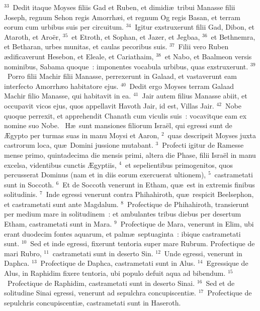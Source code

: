 ${}^{33}$~Dedit itaque Moyses filiis Gad et Ruben, et dimidi\ae\ tribui Manasse filii Joseph, regnum Sehon regis Amorrh\ae i, et regnum Og regis Basan, et terram eorum cum urbibus suis per circuitum.
${}^{34}$~Igitur exstruxerunt filii Gad, Dibon, et Ataroth, et Aro\"er,
${}^{35}$~et Etroth, et Sophan, et Jazer, et Jegbaa,
${}^{36}$~et Bethnemra, et Betharan, urbes munitas, et caulas pecoribus suis.
${}^{37}$~Filii vero Ruben \ae dificaverunt Hesebon, et Eleale, et Cariathaim,
${}^{38}$~et Nabo, et Baalmeon versis nominibus, Sabama quoque~: imponentes vocabula urbibus, quas exstruxerunt.
${}^{39}$~Porro filii Machir filii Manasse, perrexerunt in Galaad, et vastaverunt eam interfecto Amorrh\ae o habitatore ejus.
${}^{40}$~Dedit ergo Moyses terram Galaad Machir filio Manasse, qui habitavit in ea.
${}^{41}$~Jair autem filius Manasse abiit, et occupavit vicos ejus, quos appellavit Havoth Jair, id est, Villas Jair.
${}^{42}$~Nobe quoque perrexit, et apprehendit Chanath cum viculis suis~: vocavitque eam ex nomine suo Nobe.
~H\ae\ sunt mansiones filiorum Isra\"el, qui egressi sunt de \AE gypto per turmas suas in manu Moysi et Aaron,
${}^{2}$~quas descripsit Moyses juxta castrorum loca, qu\ae\ Domini jussione mutabant.
${}^{3}$~Profecti igitur de Ramesse mense primo, quintadecima die mensis primi, altera die Phase, filii Isra\"el in manu excelsa, videntibus cunctis \AE gyptiis,
${}^{4}$~et sepelientibus primogenitos, quos percusserat Dominus (nam et in diis eorum exercuerat ultionem),
${}^{5}$~castrametati sunt in Soccoth.
${}^{6}$~Et de Soccoth venerunt in Etham, qu\ae\ est in extremis finibus solitudinis.
${}^{7}$~Inde egressi venerunt contra Phihahiroth, qu\ae\ respicit Beelsephon, et castrametati sunt ante Magdalum.
${}^{8}$~Profectique de Phihahiroth, transierunt per medium mare in solitudinem~: et ambulantes tribus diebus per desertum Etham, castrametati sunt in Mara.
${}^{9}$~Profectique de Mara, venerunt in Elim, ubi erant duodecim fontes aquarum, et palm\ae\ septuaginta~: ibique castrametati sunt.
${}^{10}$~Sed et inde egressi, fixerunt tentoria super mare Rubrum. Profectique de mari Rubro,
${}^{11}$~castrametati sunt in deserto Sin.
${}^{12}$~Unde egressi, venerunt in Daphca.
${}^{13}$~Profectique de Daphca, castrametati sunt in Alus.
${}^{14}$~Egressique de Alus, in Raphidim fixere tentoria, ubi populo defuit aqua ad bibendum.
${}^{15}$~Profectique de Raphidim, castrametati sunt in deserto Sinai.
${}^{16}$~Sed et de solitudine Sinai egressi, venerunt ad sepulchra concupiscenti\ae .
${}^{17}$~Profectique de sepulchris concupiscenti\ae , castrametati sunt in Haseroth.
